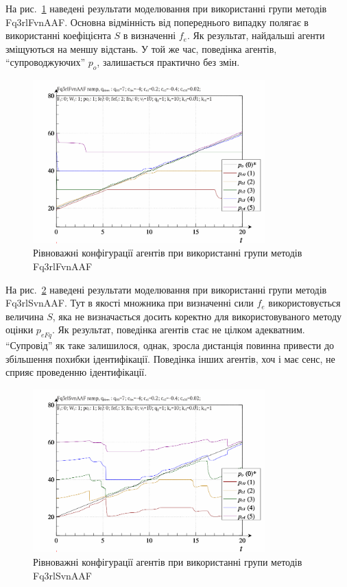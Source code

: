 На рис.~\ref{atu:f:qls_ramp_Fq3rlFvnAAF} наведені результати моделювання
при використанні групи методів Fq3rlFvnAAF. Основна відмінність від
попереднього випадку полягає в використанні коефіцієнта
$S$ в визначенні
$ f_e $. Як результат, найдальші агенти зміщуються на меншу
відстань. У той же час, поведінка агентів, ``супроводжуючих'' $p_o $, залишається практично без змін.


\begin{figure}[htb!]
  \begin{center}
    \includegraphics[width=0.8\textwidth]{p/ramp/qls-p_t_pi_Fq3rlFvnAAF_ramp.png}
  \end{center}
  \caption{Рівноважні конфігурації агентів при використанні групи методів Fq3rlFvnAAF}
  \label{atu:f:qls_ramp_Fq3rlFvnAAF}
\end{figure}

На рис.~\ref{atu:f:qls_ramp_Fq3rlSvnAAF} наведені результати моделювання при
використанні групи методів Fq3rlSvnAAF. Тут в якості множника при визначенні
сили
$ f_e $ використовується величина
$ S $, яка не визначається досить коректно для використовуваного
методу оцінки
$ p_{eFq} $. Як результат, поведінка агентів стає не цілком
адекватним. ``Супровід'' як таке залишилося, однак,
зросла дистанція повинна привести до збільшення похибки
ідентифікації. Поведінка інших агентів, хоч і має сенс, не
сприяє проведенню ідентифікації.

\begin{figure}[htb!]
  \begin{center}
    \includegraphics[width=0.8\textwidth]{p/ramp/qls-p_t_pi_Fq3rlSvnAAF_ramp.png}
  \end{center}
  \caption{Рівноважні конфігурації агентів при використанні групи методів Fq3rlSvnAAF}
  \label{atu:f:qls_ramp_Fq3rlSvnAAF}
\end{figure}


